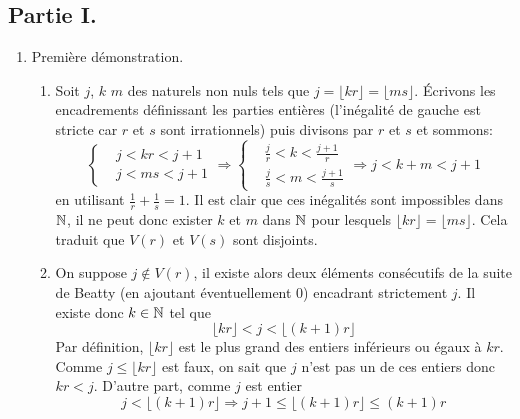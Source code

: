 \subsection*{Partie I.}
\begin{enumerate}
 \item Première démonstration.
\begin{enumerate}
 \item Soit $j$, $k$ $m$ des naturels non nuls tels que $j=\lfloor kr \rfloor = \lfloor ms\rfloor$. \'Ecrivons les encadrements définissant les parties entières (l'inégalité de gauche est stricte car $r$ et $s$ sont irrationnels) puis divisons par $r$ et $s$ et sommons:
\begin{displaymath}
\left\lbrace 
\begin{aligned}
 &j < kr < j+1 \\ &j < ms < j+1
\end{aligned}
\right. 
 \Rightarrow
\left\lbrace 
\begin{aligned}
 &\frac{j}{r}< k < \frac{j+1}{r} \\ &\frac{j}{s}< m < \frac{j+1}{s}
\end{aligned}
\right.
\Rightarrow j<k+m<j+1
\end{displaymath}
en utilisant $\frac{1}{r}+\frac{1}{s}=1$.\newline
Il est clair que ces inégalités sont impossibles dans $\mathbb{N}$, il ne peut donc exister $k$ et $m$ dans $\mathbb{N}$ pour lesquels $\lfloor kr\rfloor = \lfloor ms \rfloor$. Cela traduit que $V(r)$ et $V(s)$ sont disjoints.

 \item On suppose $j\notin V(r)$, il existe alors deux éléments consécutifs de la suite de Beatty (en ajoutant éventuellement $0$) encadrant strictement $j$. Il existe donc $k\in \mathbb{N}$ tel que 
\begin{displaymath}
 \lfloor kr \rfloor < j < \lfloor (k+1)r \rfloor 
\end{displaymath}
Par définition, $\lfloor kr \rfloor$ est le plus grand des entiers inférieurs ou égaux à $kr$. Comme $j \leq \lfloor kr \rfloor$ est faux, on sait que $j$ n'est pas un de ces entiers donc $kr < j$.\newline
D'autre part, comme $j$ est entier 
\begin{displaymath}
 j < \lfloor (k+1)r \rfloor \Rightarrow j+1 \leq \lfloor (k+1)r \rfloor \leq (k+1)r 
\end{displaymath}


\end{enumerate}
\end{enumerate}
